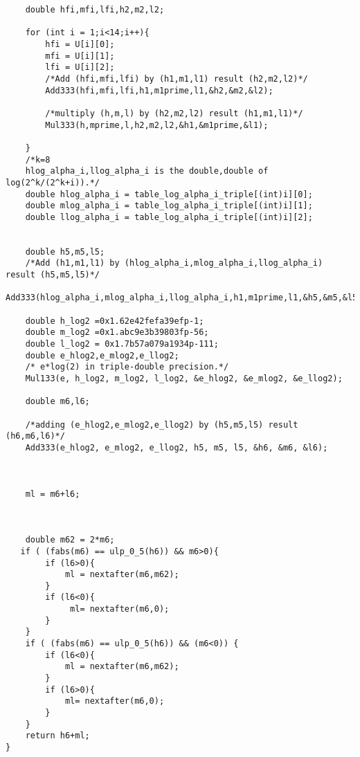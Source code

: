 \begin{lstlisting}
    double hfi,mfi,lfi,h2,m2,l2;

    for (int i = 1;i<14;i++){
        hfi = U[i][0];
        mfi = U[i][1];
        lfi = U[i][2];
        /*Add (hfi,mfi,lfi) by (h1,m1,l1) result (h2,m2,l2)*/
        Add333(hfi,mfi,lfi,h1,m1prime,l1,&h2,&m2,&l2);

        /*multiply (h,m,l) by (h2,m2,l2) result (h1,m1,l1)*/
        Mul333(h,mprime,l,h2,m2,l2,&h1,&m1prime,&l1);
       
    }
    /*k=8
    hlog_alpha_i,llog_alpha_i is the double,double of log(2^k/(2^k+i)).*/
    double hlog_alpha_i = table_log_alpha_i_triple[(int)i][0];
    double mlog_alpha_i = table_log_alpha_i_triple[(int)i][1];
    double llog_alpha_i = table_log_alpha_i_triple[(int)i][2];


    double h5,m5,l5;
    /*Add (h1,m1,l1) by (hlog_alpha_i,mlog_alpha_i,llog_alpha_i) result (h5,m5,l5)*/
    Add333(hlog_alpha_i,mlog_alpha_i,llog_alpha_i,h1,m1prime,l1,&h5,&m5,&l5);
    
    double h_log2 =0x1.62e42fefa39efp-1;
    double m_log2 =0x1.abc9e3b39803fp-56;
    double l_log2 = 0x1.7b57a079a1934p-111;
    double e_hlog2,e_mlog2,e_llog2;
    /* e*log(2) in triple-double precision.*/
    Mul133(e, h_log2, m_log2, l_log2, &e_hlog2, &e_mlog2, &e_llog2);
    
    double m6,l6;

    /*adding (e_hlog2,e_mlog2,e_llog2) by (h5,m5,l5) result (h6,m6,l6)*/
    Add333(e_hlog2, e_mlog2, e_llog2, h5, m5, l5, &h6, &m6, &l6);
    
    
    
    ml = m6+l6;
    
    
    
    double m62 = 2*m6;
   if ( (fabs(m6) == ulp_0_5(h6)) && m6>0){
        if (l6>0){
            ml = nextafter(m6,m62);
        }
        if (l6<0){
             ml= nextafter(m6,0);
        }
    }
    if ( (fabs(m6) == ulp_0_5(h6)) && (m6<0)) {
        if (l6<0){
            ml = nextafter(m6,m62);
        }
        if (l6>0){
            ml= nextafter(m6,0);
        }
    }
    return h6+ml;
}
\end{lstlisting}
\newpage

